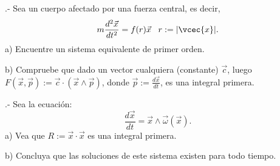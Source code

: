 .-
Sea un cuerpo afectado por una fuerza central, es decir,
\begin{equation}
  m\frac{d^2\vec{x}}{dt^2} = f(r)\vec{x}\;\;\; r:= |\vcec{x}|.
\end{equation}
%
a) Encuentre un sistema equivalente de primer orden.

b) Compruebe que dado un vector cualquiera (constante) $\vec{c}$, luego
   $F(\vec{x},\vec{p}) := \vec{c}\cdot(\vec{x}\wedge \vec{p})$,
   donde $\vec{p} := \frac{d\vec{x}}{dt}$, es una integral primera.
\ePro

.-
Sea la ecuaci\'on:
\begin{equation}
  \frac{d\vec{x}}{dt} = \vec{x} \wedge \vec{\omega}(\vec{x}).
\end{equation}
%
a) Vea que $R:= \vec{x}\cdot\vec{x}$ es una integral primera.

b) Concluya que las soluciones de este sistema existen para todo tiempo.
\ePro















 

